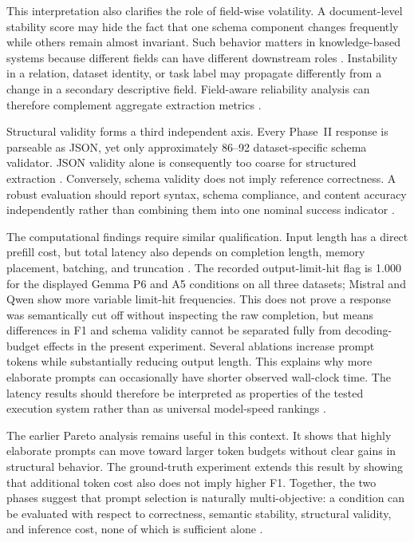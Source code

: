 \documentclass[fleqn,10pt]{wlscirep-authoryear}
\begin{document}
This interpretation also clarifies the role of field-wise volatility. A
document-level stability score may hide the fact that one schema component changes
frequently while others remain almost invariant. Such behavior matters in
knowledge-based systems because different fields can have different downstream
roles
\cite{li2024structuredIE,dai2025kgllm,yang2025kbsSurvey}.
Instability in a relation, dataset identity, or task label may propagate
differently from a change in a secondary descriptive field. Field-aware
reliability analysis can therefore complement aggregate extraction metrics
\cite{li2024structuredIE,yang2025kbsSurvey}.

Structural validity forms a third independent axis. Every Phase~II response is
parseable as JSON, yet only approximately 86--92%
dataset-specific schema validator. JSON validity alone is consequently too coarse
for structured extraction
\cite{tam2024formatRestrictions,li2024structuredIE}.
Conversely, schema validity does not imply reference
correctness. A robust evaluation should report syntax, schema compliance, and
content accuracy independently rather than combining them into one nominal
success indicator
\cite{tam2024formatRestrictions,li2024structuredIE}.

The computational findings require similar qualification. Input length has a
direct prefill cost, but total latency also depends on completion length, memory
placement, batching, and truncation
\cite{agrawal2024sarathi}.
The recorded output-limit-hit flag is 1.000 for the displayed Gemma P6 and
A5 conditions on all three datasets; Mistral and Qwen show more variable
limit-hit frequencies. This does not prove a response was semantically cut off
without inspecting the raw completion, but means differences in F1 and schema
validity cannot be separated fully from decoding-budget effects in the present
experiment. Several ablations increase prompt tokens while
substantially reducing output length. This explains why more elaborate prompts can
occasionally have shorter observed wall-clock time. The latency results should
therefore be interpreted as properties of the tested execution system rather than
as universal model-speed rankings
\cite{agrawal2024sarathi}.

The earlier Pareto analysis remains useful in this context. It shows that highly
elaborate prompts can move toward larger token budgets without clear gains in
structural behavior. The ground-truth experiment extends this result by showing
that additional token cost also does not imply higher F1. Together, the two phases
suggest that prompt selection is naturally multi-objective: a condition can be
evaluated with respect to correctness, semantic stability, structural validity,
and inference cost, none of which is sufficient alone
\cite{tam2024formatRestrictions,li2024structuredIE,agrawal2024sarathi}.
\end{document}
